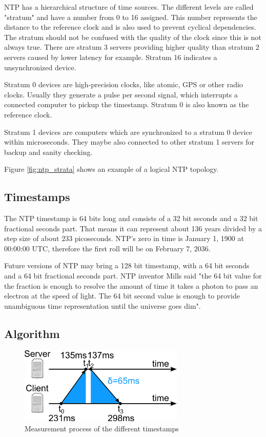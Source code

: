 NTP has a hierarchical structure of time sources. The different levels are called "stratum" and have a number from 0 to 16 assigned. This number represents the distance to the reference clock and is also used to prevent cyclical dependencies. The stratum should not be confused with the quality of the clock since this is not always true. There are stratum 3 servers providing higher quality than stratum 2 servers caused by lower latency for example. Stratum 16 indicates a unsynchronized device.

Stratum 0 devices are high-precision clocks, like atomic, GPS or other radio clocks. Usually they generate a pulse per second signal, which interrupts a connected computer to pickup the timestamp. Stratum 0 is also known as the reference clock.

Stratum 1 devices are computers which are synchronized to a stratum 0 device within microseconds. They maybe also connected to other stratum 1 servers for backup and sanity checking.

Figure \ref{fig:ntp_strata} shows an example of a logical NTP topology.

\subsection{Timestamps}

The NTP timestamp is 64 bits long and consists of a 32 bit seconds and a 32 bit fractional seconds part. That means it can represent about 136 years divided by a step size of about 233 picoseconds. NTP’s zero in time is January 1, 1900 at 00:00:00 UTC, therefore the first roll will be on February 7, 2036.

Future versions of NTP may bring a 128 bit timestamp, with a 64 bit seconds and a 64 bit fractional seconds part. NTP inventor Mills said "the 64 bit value for the fraction is enough to resolve the amount of time it takes a photon to pass an electron at the speed of light. The 64 bit second value is enough to provide unambiguous time representation until the universe goes dim".

\subsection{Algorithm}

\begin{figure}[tb]
	\centering
	\includegraphics[width=0.7\textwidth]{figures/ntp_algorithm.png}
	\caption{Measurement process of the different timestamps}
	\label{fig:ntp_algorithm}
\end{figure}

